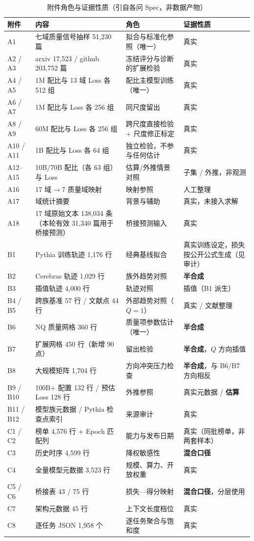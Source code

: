 \begin{table}[H]
\centering\footnotesize
\caption{附件角色与证据性质（引自各问 Spec，非数据产物）}
\label{tab:attach}
\begin{tabularx}{\textwidth}{@{}p{1.25cm}X p{3.8cm}p{3.05cm}@{}}
\toprule
附件 & 内容 & 角色 & 证据性质 \\
\midrule
A1 & 七域质量信号抽样 51,230 篇 & 拟合与标准化参照（唯一） & 真实 \\
A2 / A3 & arxiv 17,523 / github 203,752 篇 & 冻结评分与诊断的扩展检验 & 真实 \\
A4 / A5 & 1M 配比与 13 域 Loss 各 512 组 & 配比主模型训练（唯一） & 真实 \\
A6 / A7 & 1M 配比与 Loss 各 256 组 & 同尺度留出 & 真实 \\
A8 / A9 & 60M 配比与 Loss 各 256 组 & 跨尺度直接检验 + 尺度修正标定 & 真实 \\
A10 / A11 & 1B 配比与 Loss 各 64 组 & 独立检验，不参与任何估计 & 真实 \\
A12–A15 & 10B/70B 配比（各 63 组）与 Loss & 估算/外推情景对照 & 子集 / 外推，非观测 \\
A16 & 17 域$\to$7 质量域映射 & 映射参照 & 人工整理 \\
A17 & 域统计摘要 & 背景与辅助 & 真实，未接入求解 \\
A18 & 17 域原始文本 138,034 条（本轮有效 31,340 篇用于桥接预测） & 桥接预测输入 & 真实 \\
B1 & Pythia 训练轨迹 1,176 行 & 经典基线拟合 & 真实训练设定，损失按公开公式生成（见审计） \\
B2 & Cerebras 轨迹 1,029 行 & 族外趋势对照 & \textbf{半合成} \\
B3 & 插值轨迹 4,000 行 & 轨迹对照 & 插值（B1 派生） \\
B4 / B5 & 跨族基准 57 行 / 文献点 44 行 & 外部趋势对照（$Q=1$） & 真实 / 文献整理 \\
B6 & NQ 质量网格 360 行 & 质量项参数估计（唯一） & \textbf{半合成} \\
B7 & 扩展网格 450 行（新增 90 点） & 留出检验 & \textbf{半合成}，$Q$ 方向插值 \\
B8 & 大规模矩阵 1,704 行 & 方向冲突压力检查 & \textbf{半合成}，与 B6/B7 方向相反 \\
B9 / B10 & 100B+ 配置 132 行 / 预估 Loss 128 行 & 外推参照 & 真实元数据 / \textbf{估算} \\
B11 / B12 & 模型族元数据 / Pythia 检查点索引 & 来源审计 & 真实 \\
C1 / C2 & 榜单 4,576 行 + Epoch 匹配列 & 能力与发布日期 & 真实（同批榜单，非两套样本） \\
C3 & 历史时序 4,599 行 & 降权敏感性 & \textbf{混合口径} \\
C4 & 全量模型元数据 3,523 行 & 规模、算力、开放权重 & 真实 \\
C5 / C6 & 桥接表 43 / 75 行 & 损失—得分映射 & \textbf{混合口径}，分层使用 \\
C7 & 架构元数据 45 行 & 上下文长度档位 & 真实 \\
C8 & 逐任务 JSON 1,958 个 & 逐任务聚合与饱和度 & 真实 \\
\bottomrule
\end{tabularx}
\end{table}


